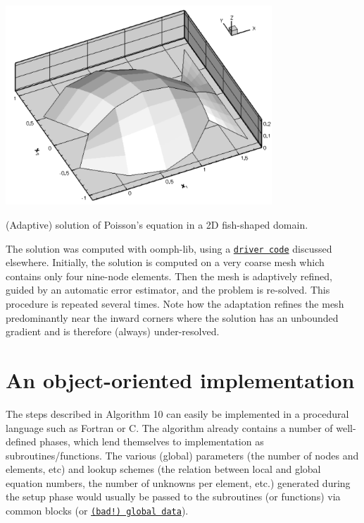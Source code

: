  
\begin{DoxyImage}
\includegraphics[width=0.75\textwidth]{fish_poisson_soln}
\caption{(Adaptive) solution of Poisson's equation in a 2\-D fish-\/shaped domain. }
\end{DoxyImage}


The solution was computed with {\ttfamily oomph-\/lib}, using a \href{../../poisson/fish_poisson/html/index.html}{\tt driver code} discussed elsewhere. Initially, the solution is computed on a very coarse mesh which contains only four nine-\/node elements. Then the mesh is adaptively refined, guided by an automatic error estimator, and the problem is re-\/solved. This procedure is repeated several times. Note how the adaptation refines the mesh predominantly near the inward corners where the solution has an unbounded gradient and is therefore (always) under-\/resolved.



 

\hypertarget{index_towards_oo}{}\section{An object-\/oriented implementation}\label{index_towards_oo}
The steps described in Algorithm 10 can easily be implemented in a procedural language such as Fortran or C. The algorithm already contains a number of well-\/defined phases, which lend themselves to implementation as subroutines/functions. The various (global) parameters (the number of nodes and elements, etc) and lookup schemes (the relation between local and global equation numbers, the number of unknowns per element, etc.) generated during the setup phase would usually be passed to the subroutines (or functions) via common blocks (or \href{http://c2.com/cgi/wiki?GlobalVariablesAreBad}{\tt (bad!) global data}).

